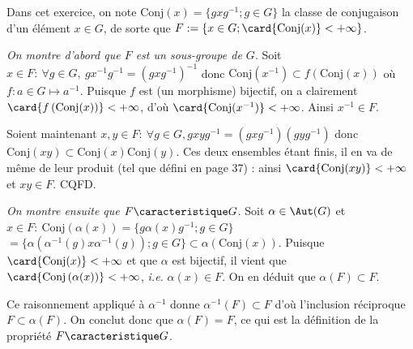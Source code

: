 Dans cet exercice, on note $\text{Conj}(x) = \{gxg^{-1} ; g\in G\}$ la classe de conjugaison d'un élément $x \in G$, de sorte que $F:= \{x\in G ; \card{\text{Conj}(x) } < +\infty\}$.

\emph{On montre d'abord que $F$ est un sous-groupe de $G$}. Soit $x\in F:~ \forall g\in G,~ gx^{-1}g^{-1} = \left(gxg^{-1}\right)^{-1}$ donc $\text{Conj}(x^{-1})\subset f\left(\text{Conj}(x)\right)$ où $f\colon a\in G\mapsto a^{-1}$. Puisque $f$ est (un morphisme) bijectif, on a clairement $\card{f\left(\text{Conj}(x) \right)} < +\infty$, d'où  $\card{\text{Conj}(x^{-1}) } < +\infty$. Ainsi $x^{-1} \in F$.

Soient maintenant $x,y\in F :~ \forall g\in G, gxyg^{-1} = (gxg^{-1})(gyg^{-1})$ donc $\text{Conj}(xy)\subset \text{Conj}(x) \text{Conj}(y)$. Ces deux ensembles étant finis, il en va de même de leur produit (tel que défini en page 37) : ainsi $\card{\text{Conj}(xy) } < +\infty$ et $xy\in F$. CQFD.

\emph{On montre ensuite que $F\caracteristique G$}. Soit $\alpha \in \Aut(G)$ et $x\in F :~ \text{Conj}\left(\alpha(x)\right) = \{g\alpha(x)g^{-1}; g\in G\}$ ~ $ = \{\alpha\left(\alpha^{-1}(g)x \alpha^{-1}(g) \right); g\in G \} \subset \alpha\left(\text{Conj}(x) \right)$. Puisque $ \card{\text{Conj}(x) } < +\infty$ et que $\alpha$ est bijectif, il vient que $ \card{\text{Conj}\left(\alpha(x)\right) } < +\infty$, \textit{i.e.} $\alpha(x) \in F$. On en déduit que $\alpha(F) \subset F$.

Ce raisonnement appliqué à $\alpha^{-1}$ donne $\alpha^{-1}(F) \subset F$ d'où l'inclusion réciproque $F\subset \alpha(F)$. On conclut donc que $\alpha(F) = F$, ce qui est la définition de la propriété $F\caracteristique G$.

